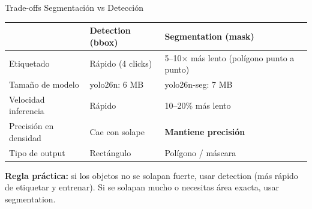 \documentclass[aspectratio=169, 11pt]{beamer}
\begin{document}
\begin{frame}[shrink]{Trade-offs Segmentaci\'on vs Detecci\'on}
  \vspace{8pt}
  {\footnotesize
  \begin{tabular}{@{}p{3.5cm} p{4.0cm} p{4.5cm}@{}}
    \toprule
    & \textbf{Detection (bbox)} & \textbf{Segmentation (mask)} \\
    \midrule
    \rowcolor{arcaGray}
    Etiquetado
    & R\'apido (4 clicks)
    & 5--10$\times$ m\'as lento (pol\'igono punto a punto) \\
    Tama\~no de modelo
    & yolo26n: 6 MB
    & yolo26n-seg: 7 MB \\
    \rowcolor{arcaGray}
    Velocidad inferencia
    & R\'apido
    & 10--20\% m\'as lento \\
    Precisi\'on en densidad
    & Cae con solape
    & \textbf{Mantiene precisi\'on} \\
    \rowcolor{arcaGray}
    Tipo de output
    & Rect\'angulo
    & Pol\'igono / m\'ascara \\
    \bottomrule
  \end{tabular}
  }

  \vspace{10pt}
  \begin{tcolorbox}[colback=codeGreen!8, colframe=codeGreen, boxrule=0.5pt,
    arc=2pt, left=6pt, right=6pt, top=4pt, bottom=4pt]
    {\scriptsize\color{arcaDark}
    \faKey\hspace{4pt}\textbf{Regla pr\'actica:} si los objetos no se solapan
    fuerte, usar detection (m\'as r\'apido de etiquetar y entrenar). Si se
    solapan mucho o necesitas \'area exacta, usar segmentation.}
  \end{tcolorbox}
\end{frame}
\end{document}

